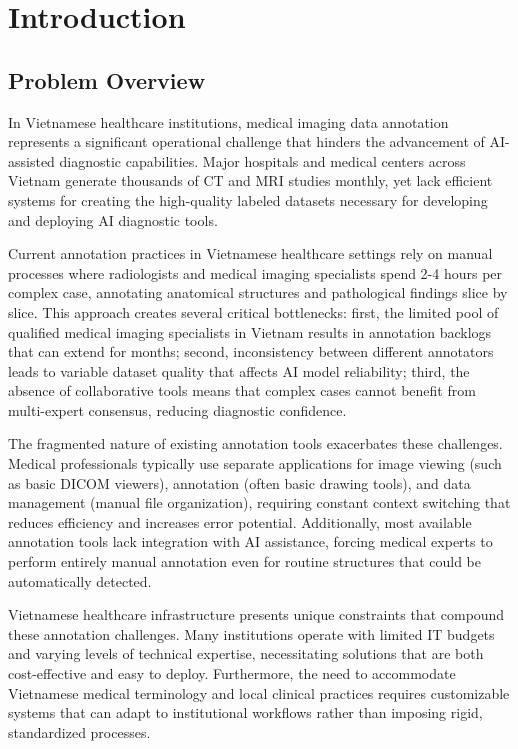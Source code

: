 \chapter{Introduction}

\section{Problem Overview}

In Vietnamese healthcare institutions, medical imaging data annotation represents a significant operational challenge that hinders the advancement of AI-assisted diagnostic capabilities. Major hospitals and medical centers across Vietnam generate thousands of CT and MRI studies monthly, yet lack efficient systems for creating the high-quality labeled datasets necessary for developing and deploying AI diagnostic tools.

Current annotation practices in Vietnamese healthcare settings rely on manual processes where radiologists and medical imaging specialists spend 2-4 hours per complex case, annotating anatomical structures and pathological findings slice by slice. This approach creates several critical bottlenecks: first, the limited pool of qualified medical imaging specialists in Vietnam results in annotation backlogs that can extend for months; second, inconsistency between different annotators leads to variable dataset quality that affects AI model reliability; third, the absence of collaborative tools means that complex cases cannot benefit from multi-expert consensus, reducing diagnostic confidence.

The fragmented nature of existing annotation tools exacerbates these challenges. Medical professionals typically use separate applications for image viewing (such as basic DICOM viewers), annotation (often basic drawing tools), and data management (manual file organization), requiring constant context switching that reduces efficiency and increases error potential. Additionally, most available annotation tools lack integration with AI assistance, forcing medical experts to perform entirely manual annotation even for routine structures that could be automatically detected.

Vietnamese healthcare infrastructure presents unique constraints that compound these annotation challenges. Many institutions operate with limited IT budgets and varying levels of technical expertise, necessitating solutions that are both cost-effective and easy to deploy. Furthermore, the need to accommodate Vietnamese medical terminology and local clinical practices requires customizable systems that can adapt to institutional workflows rather than imposing rigid, standardized processes.

